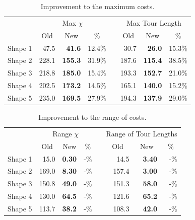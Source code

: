 \documentclass[../main.tex]{subfiles}
\begin{document}
\begin{table}
	\centering
	\caption{Improvement to the maximum costs.}
	\label{table:decomposition_improvement_max}
	\begin{tabular}{@{}l rrrrrrr}
		\toprule
		& \multicolumn{3}{c}{Max $\chi$} && \multicolumn{3}{c}{Max Tour Length} \\
		\cmidrule{2-4} \cmidrule{6-8}
		& \multicolumn{1}{c}{Old} & \multicolumn{1}{c}{New} & \multicolumn{1}{c}{\%} & & \multicolumn{1}{c}{Old} & \multicolumn{1}{c}{New} & \multicolumn{1}{c}{\%}  \\
		\cmidrule{1-8}
		Shape 1 & 47.5  & \bf{41.6}  & 12.4\% && 30.7  & \bf{26.0}  & 15.3\% \\
		Shape 2 & 228.1 & \bf{155.3} & 31.9\% && 187.6 & \bf{115.4} & 38.5\% \\
		Shape 3 & 218.8 & \bf{185.0} & 15.4\% && 193.3 & \bf{152.7} & 21.0\% \\
		Shape 4 & 202.5 & \bf{173.2} & 14.5\% && 165.1 & \bf{140.0} & 15.2\% \\
		Shape 5 & 235.0 & \bf{169.5} & 27.9\% && 194.3 & \bf{137.9} & 29.0\% \\
		\bottomrule
	\end{tabular}
\end{table}

\begin{table}
	\centering
	\caption{Improvement to the range of costs.}
	\label{table:decomposition_improvement_deviation}
	\begin{tabular}{@{}l rrrrrrr}
		\toprule
		& \multicolumn{3}{c}{Range $\chi$} && \multicolumn{3}{c}{Range of Tour Lengths} \\
		\cmidrule{2-4} \cmidrule{6-8}
		& \multicolumn{1}{c}{Old} & \multicolumn{1}{c}{New} & \multicolumn{1}{c}{\%} & & \multicolumn{1}{c}{Old} & \multicolumn{1}{c}{New} & \multicolumn{1}{c}{\%}  \\
		\cmidrule{1-8}
		Shape 1 & 15.0  & \bf{0.30} & -\% && 14.5  & \bf{3.40} & -\% \\
		Shape 2 & 169.0 & \bf{8.30} & -\% && 157.4 & \bf{3.00} & -\% \\
		Shape 3 & 150.8 & \bf{49.0} & -\% && 151.3 & \bf{58.0} & -\% \\
		Shape 4 & 130.0 & \bf{64.5} & -\% && 121.6 & \bf{65.2} & -\% \\
		Shape 5 & 113.7 & \bf{38.2} & -\% && 108.3 & \bf{42.0} & -\% \\
		\bottomrule
	\end{tabular}
\end{table}
\end{document}
